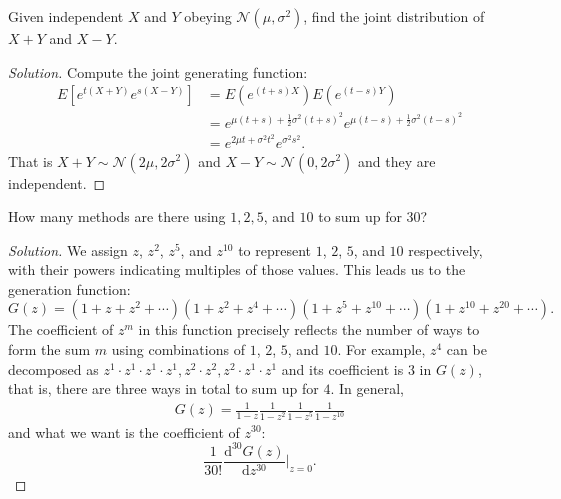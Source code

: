 \documentclass[11pt,singlecolumn, openany, citestyle=authoryear]{elegantbook}
\begin{document}
\begin{CJK}{UTF8}{gbsn}
\begin{example}
    Given independent $X$ and $Y$ obeying $\mathcal{N}(\mu,\sigma^2)$, find the 
    joint distribution of $X+Y$ and $X-Y$.
\end{example}
\begin{proof}[Solution]
    Compute the joint generating function:
\begin{align*}
    E[e^{t(X+Y)}e^{s(X-Y)}] & = E(e^{(t+s)X}) E(e^{(t-s)Y})\\
    &= e^{\mu(t+s)+\frac{1}{2}\sigma^2(t+s)^2} e^{\mu(t-s)+\frac{1}{2}\sigma^2(t-s)^2}\\
    &= e^{2\mu t+\sigma^2t^2} e^{\sigma^2s^2}.
\end{align*}
That is $X+Y \sim \mathcal{N}(2\mu,2\sigma^2)$ and $X-Y\sim \mathcal{N}(0,2\sigma^2)$
and they are independent.
\end{proof}

\begin{exercise}
    How many methods are there using $1,2,5$, and $10$ to sum up for $30$? 
\end{exercise}
\begin{proof}[Solution]
    We assign $z$, $z^2$, $z^5$, and $z^{10}$ to represent $1$, $2$, $5$, and $10$ respectively, 
    with their powers indicating multiples of those values. This leads us to the generation function:
    $$
    G(z)=(1+z+z^2+\cdots)(1+z^2+z^4+\cdots)(1+z^5+z^{10}+\cdots)(1+z^{10}+z^{20}+\cdots).
    $$
    The coefficient of $z^m$ in this function precisely reflects the number of ways to form the sum $m$
    using combinations of $1$, $2$, $5$, and $10$.
    For example, $z^4$ can be decomposed as 
    $z^1\cdot z^1 \cdot z^1 \cdot z^1, z^2 \cdot z^2, z^2 \cdot z^1 \cdot z^1$ and its 
    coefficient is $3$ in $G(z)$, that is, there are three ways in total to sum up for $4$. 
    In general, 
    \begin{align*}
        G(z)=\frac{1}{1-z}\frac{1}{1-z^2}\frac{1}{1-z^5}\frac{1}{1-z^{10}}
    \end{align*}
    and what we want is the coefficient of $z^{30}$:
    $$
    \frac{1}{30!}\frac{\mathrm{d}^{30}G(z)}{\mathrm{d}z^{30}}\bigg|_{z=0}.
    $$
\end{proof}


\end{CJK}
\end{document}

